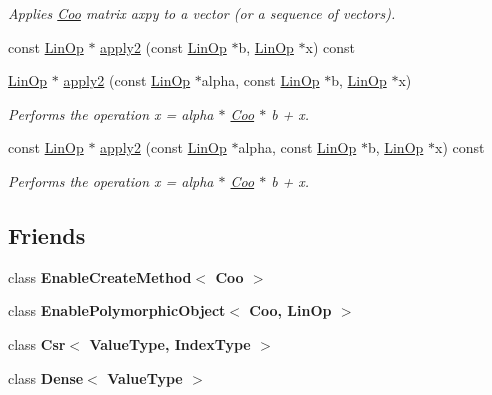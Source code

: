 \begin{DoxyCompactItemize}
\begin{DoxyCompactList}\small\item\em Applies \hyperlink{classgko_1_1matrix_1_1Coo}{Coo} matrix axpy to a vector (or a sequence of vectors). \end{DoxyCompactList}\item 
const \hyperlink{classgko_1_1LinOp}{Lin\+Op} $\ast$ \hyperlink{classgko_1_1matrix_1_1Coo_a48b3fd46edc8b1770f2800e94871eb41}{apply2} (const \hyperlink{classgko_1_1LinOp}{Lin\+Op} $\ast$b, \hyperlink{classgko_1_1LinOp}{Lin\+Op} $\ast$x) const
\item 
\hyperlink{classgko_1_1LinOp}{Lin\+Op} $\ast$ \hyperlink{classgko_1_1matrix_1_1Coo_a549dafbe9245e3fcef3b02c4d6914c84}{apply2} (const \hyperlink{classgko_1_1LinOp}{Lin\+Op} $\ast$alpha, const \hyperlink{classgko_1_1LinOp}{Lin\+Op} $\ast$b, \hyperlink{classgko_1_1LinOp}{Lin\+Op} $\ast$x)
\begin{DoxyCompactList}\small\item\em Performs the operation x = alpha $\ast$ \hyperlink{classgko_1_1matrix_1_1Coo}{Coo} $\ast$ b + x. \end{DoxyCompactList}\item 
const \hyperlink{classgko_1_1LinOp}{Lin\+Op} $\ast$ \hyperlink{classgko_1_1matrix_1_1Coo_a05062dbf88132edf3a13d23783a8b07d}{apply2} (const \hyperlink{classgko_1_1LinOp}{Lin\+Op} $\ast$alpha, const \hyperlink{classgko_1_1LinOp}{Lin\+Op} $\ast$b, \hyperlink{classgko_1_1LinOp}{Lin\+Op} $\ast$x) const
\begin{DoxyCompactList}\small\item\em Performs the operation x = alpha $\ast$ \hyperlink{classgko_1_1matrix_1_1Coo}{Coo} $\ast$ b + x. \end{DoxyCompactList}\end{DoxyCompactItemize}
\subsection*{Friends}
\begin{DoxyCompactItemize}
\item 
\mbox{\label{classgko_1_1matrix_1_1Coo_a7b73c83603cbcededd15ded9a873ea33}} 
class {\bfseries Enable\+Create\+Method$<$ Coo $>$}
\item 
\mbox{\label{classgko_1_1matrix_1_1Coo_a29c635db859b174df4d1cdc8be3ff2be}} 
class {\bfseries Enable\+Polymorphic\+Object$<$ Coo, Lin\+Op $>$}
\item 
\mbox{\label{classgko_1_1matrix_1_1Coo_a3962faf971a3df6ff4c9226c61fb24cc}} 
class {\bfseries Csr$<$ Value\+Type, Index\+Type $>$}
\item 
\mbox{\label{classgko_1_1matrix_1_1Coo_a22a84c8f67f946aa60a2fa8bf5835a32}} 
class {\bfseries Dense$<$ Value\+Type $>$}
\end{DoxyCompactItemize}
